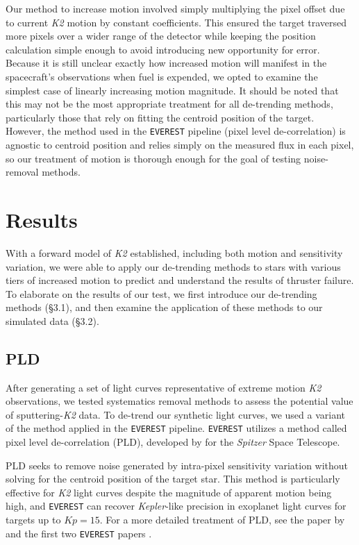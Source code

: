 \documentclass[12pt,preprint]{aastex}
\begin{document}
Our method to increase motion involved simply multiplying the pixel offset due to current \textit{K2} motion by constant coefficients. This ensured the target traversed more pixels over a wider range of the detector while keeping the position calculation simple enough to avoid introducing new opportunity for error. Because it is still unclear exactly how increased motion will manifest in the spacecraft's observations when fuel is expended, we opted to examine the simplest case of linearly increasing motion magnitude. It should be noted that this may not be the most appropriate treatment for all de-trending methods, particularly those that rely on fitting the centroid position of the target. However, the method used in the \texttt{EVEREST} pipeline (pixel level de-correlation) is agnostic to centroid position and relies simply on the measured flux in each pixel, so our treatment of motion is thorough enough for the goal of testing noise-removal methods.

\section{Results}

With a forward model of \textit{K2} established, including both motion and sensitivity variation, we were able to apply our de-trending methods to stars with various tiers of increased motion to predict and understand the results of thruster failure. To elaborate on the results of our test, we first introduce our de-trending methods (\S 3.1), and then examine the application of these methods to our simulated data (\S 3.2).

\subsection{PLD}

After generating a set of light curves representative of extreme motion \textit{K2} observations, we tested systematics removal methods to assess the potential value of sputtering-\textit{K2} data. To de-trend our synthetic light curves, we used a variant of the method applied in the \texttt{EVEREST} pipeline. \texttt{EVEREST} utilizes a method called pixel level de-correlation (PLD), developed by \cite{0004-637X-805-2-132} for the \textit{Spitzer} Space Telescope.

PLD seeks to remove noise generated by intra-pixel sensitivity variation without solving for the centroid position of the target star. This method is particularly effective for \textit{K2} light curves despite the magnitude of apparent motion being high, and \texttt{EVEREST} can recover \textit{Kepler}-like precision in exoplanet light curves for targets up to $Kp = 15$. For a more detailed treatment of PLD, see the paper by \cite{0004-637X-805-2-132} and the first two \texttt{EVEREST} papers \citep{2016AJ....152..100L,2018AJ....156...99L}.
\end{document}
